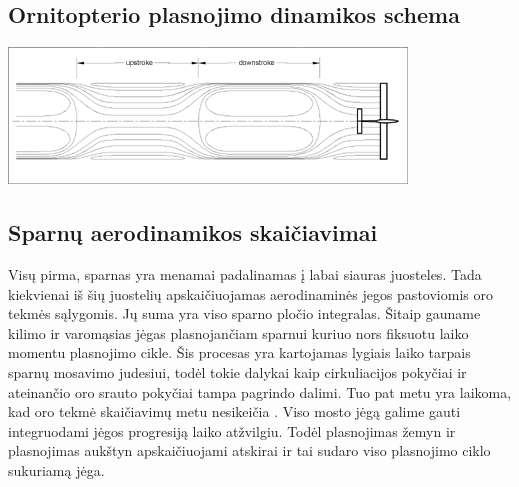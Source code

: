 \documentclass{VUMIFPSkursinis}
\begin{document}
\subsection{Ornitopterio plasnojimo dinamikos schema}
\includegraphics{img/vortex}\\

\subsection{Sparnų aerodinamikos skaičiavimai}
Visų pirma, sparnas yra menamai padalinamas į labai siauras juosteles. Tada kiekvienai iš šių juostelių apskaičiuojamas aerodinaminės jegos pastoviomis oro tekmės sąlygomis. Jų suma yra viso sparno pločio integralas.
Šitaip gauname kilimo ir varomąsias jėgas plasnojančiam sparnui kuriuo nors fiksuotu laiko momentu plasnojimo cikle.
Šis procesas yra kartojamas lygiais laiko tarpais sparnų mosavimo judesiui, todėl tokie dalykai kaip cirkuliacijos pokyčiai ir ateinančio oro srauto pokyčiai tampa pagrindo dalimi. Tuo pat metu yra laikoma, kad oro tekmė skaičiavimų metu nesikeičia .
Viso mosto jėgą galime gauti integruodami jėgos progresiją laiko atžvilgiu. Todėl plasnojimas žemyn ir plasnojimas aukštyn apskaičiuojami atskirai ir tai sudaro viso plasnojimo ciklo sukuriamą jėga.
\end{document}

